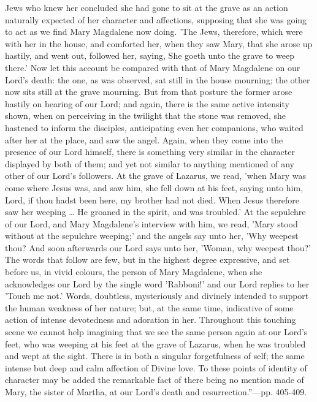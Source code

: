 Jews who knew her concluded she had gone to sit at the grave as an
action naturally expected of her character and affections, supposing
that she was going to act as we find Mary Magdalene now doing. 'The
Jews, therefore, which were with her in the house, and comforted her,
when they saw Mary, that she arose up hastily, and went out, followed
her, saying, She goeth unto the grave to weep there.' Now let this
account be compared with that of Mary Magdalene on our Lord's death: the
one, as was observed, sat still in the house mourning; the other now
sits still at the grave mourning. But from that posture the
former arose hastily on hearing of our Lord; and again, there is the
same active intensity shown, when on perceiving in the twilight that the
stone was removed, she hastened to inform the disciples, anticipating
even her companions, who waited after her at the place, and saw the
angel. Again, when they come into the presence of our Lord himself,
there is something very similar in the character displayed by both of
them; and yet not similar to anything mentioned of any other of our Lord's
followers. At the grave of Lazarus, we read, 'when Mary was come where
Jesus was, and saw him, she fell down at his feet, saying unto him,
Lord, if thou hadst been here, my brother had not died. When Jesus
therefore saw her weeping … He groaned in the spirit, and was
troubled.' At the scpulchre of our Lord, and Mary Magdalene's interview
with him, we read, 'Mary stood without at the sepulchre weeping;' and
the angels say unto her, 'Why weepest thou? And soon afterwards our Lord
says unto her, 'Woman, why weepest thou?' The words that follow are few,
but in the highest degree expressive, and set before us, in vivid
colours, the person of Mary Magdalene, when she acknowledges our Lord by
the single word 'Rabboni!' and our Lord replies to her 'Touch me not.'
Words, doubtless, mysteriously and divinely intended to support the
human weakness of her nature; but, at the same time, indicative of some
action of intense devotedness and adoration in her. Throughout this
touching scene we cannot help imagining that we see the same person
again at our Lord's feet, who was weeping at his feet at the grave of
Lazarus, when he was troubled and wept at the sight. There is in both a
singular forgetfulness of self; the same intense but deep and calm
affection of Divine love. To these points of identity of character may
be added the remarkable fact of there being no mention made of Mary, the
sister of Martha, at our Lord's death and resurrection.''—pp. 405-409.


